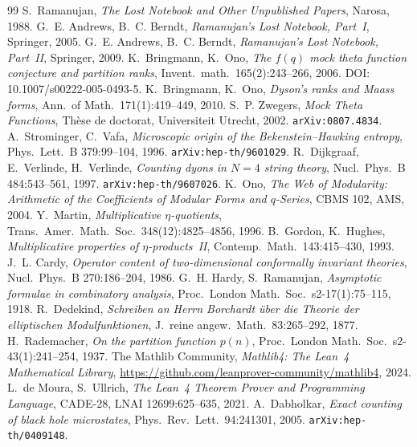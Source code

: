 \documentclass[11pt,a4paper]{article}
\theoremstyle{plain}
\theoremstyle{definition}
\begin{document}

\begin{thebibliography}{99}
 S.~Ramanujan, \emph{The Lost Notebook and Other Unpublished Papers}, Narosa, 1988.
 G.~E. Andrews, B.~C. Berndt, \emph{Ramanujan's Lost Notebook, Part~I}, Springer, 2005.
 G.~E. Andrews, B.~C. Berndt, \emph{Ramanujan's Lost Notebook, Part~II}, Springer, 2009.
 K.~Bringmann, K.~Ono, \emph{The $f(q)$ mock theta function conjecture and partition ranks}, Invent.\ math.\ 165(2):243--266, 2006. DOI: 10.1007/s00222-005-0493-5.
 K.~Bringmann, K.~Ono, \emph{Dyson's ranks and Maass forms}, Ann.\ of Math.\ 171(1):419--449, 2010.
 S.~P. Zwegers, \emph{Mock Theta Functions}, Thèse de doctorat, Universiteit Utrecht, 2002. \texttt{arXiv:0807.4834}.
 A.~Strominger, C.~Vafa, \emph{Microscopic origin of the Bekenstein--Hawking entropy}, Phys.\ Lett.\ B 379:99--104, 1996. \texttt{arXiv:hep-th/9601029}.
 R.~Dijkgraaf, E.~Verlinde, H.~Verlinde, \emph{Counting dyons in $N=4$ string theory}, Nucl.\ Phys.\ B 484:543--561, 1997. \texttt{arXiv:hep-th/9607026}.
 K.~Ono, \emph{The Web of Modularity: Arithmetic of the Coefficients of Modular Forms and $q$-Series}, CBMS 102, AMS, 2004.
 Y.~Martin, \emph{Multiplicative $\eta$-quotients}, Trans.\ Amer.\ Math.\ Soc.\ 348(12):4825--4856, 1996.
 B.~Gordon, K.~Hughes, \emph{Multiplicative properties of $\eta$-products~II}, Contemp.\ Math.\ 143:415--430, 1993.
 J.~L. Cardy, \emph{Operator content of two-dimensional conformally invariant theories}, Nucl.\ Phys.\ B 270:186--204, 1986.
 G.~H. Hardy, S.~Ramanujan, \emph{Asymptotic formulae in combinatory analysis}, Proc.\ London Math.\ Soc.\ s2-17(1):75--115, 1918.
 R.~Dedekind, \emph{Schreiben an Herrn Borchardt über die Theorie der elliptischen Modulfunktionen}, J.\ reine angew.\ Math.\ 83:265--292, 1877.
 H.~Rademacher, \emph{On the partition function $p(n)$}, Proc.\ London Math.\ Soc.\ s2-43(1):241--254, 1937.
 The Mathlib Community, \emph{Mathlib4: The Lean~4 Mathematical Library}, \url{https://github.com/leanprover-community/mathlib4}, 2024.
 L.~de Moura, S.~Ullrich, \emph{The Lean~4 Theorem Prover and Programming Language}, CADE-28, LNAI 12699:625--635, 2021.
 A.~Dabholkar, \emph{Exact counting of black hole microstates}, Phys.\ Rev.\ Lett.\ 94:241301, 2005. \texttt{arXiv:hep-th/0409148}.

\end{thebibliography}
\end{document}
